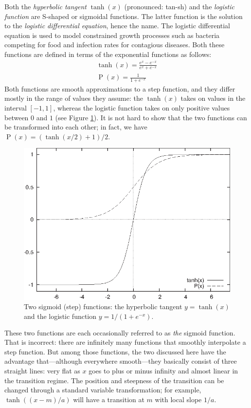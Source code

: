 Both the \emph{hyperbolic tangent} $\tanh(x)$ (pronounced: tan-sh) and 
the \emph{logistic function} are S-shaped or sigmoidal functions. The
latter function is the solution to the \emph{logistic differential
  equation}, hence the name. The logistic\vadjust{\pagebreak} differential equation is
used to model constrained growth processes such as bacteria competing
for food and infection rates for contagious diseases. Both these
functions are defined in terms of the exponential functions as
follows:
%
\begin{gather*}
  \tanh(x)            = \frac{e^x - e^{-x}}{e^x + e^{-x}} \\
  \operatorname{P}(x) = \frac{1}{1 + e^{-x}}
\end{gather*}
%
Both functions are smooth approximations to a step function, and they
differ mostly in the range of values they assume: the $\tanh(x)$ takes on
values in the interval $[-1,1]$, whereas the logistic function takes
on only positive values between $0$ and $1$ (see Figure
\ref{fig:sigmoid}). It is not hard to show that the two functions can
be transformed into each other; in fact, we have $\operatorname{P}(x)
= (\tanh(x/2)+1)/2$.

\begin{figure}
  \centerline{\includegraphics{img/step}}
  \caption{Two sigmoid (step) functions: the hyperbolic tangent $y =
    \tanh(x)$ and the logistic function $y = 1/(1 + e^{-x})$.}
  \label{fig:sigmoid}
\end{figure}

These two functions are each occasionally referred to as \emph{the}
sigmoid function.  That is incorrect: there are infinitely many
functions that smoothly interpolate a step function. But among those
functions, the two discussed here have the advantage that---although
everywhere smooth---they basically consist of three straight lines:
very flat as $x$ goes to plus or minus infinity and almost linear in
the transition regime. The position and steepness of the transition
can be changed through a standard variable transformation; for
example, $\tanh( (x-m)/a )$ will have a transition at $m$ with local
slope $1/a$.

